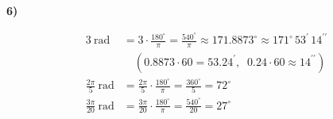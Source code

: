 \documentclass[11pt,a4paper,fleqn]{article}
\begin{document}
\textbf{6)}

\begin{align*}
  3\ \text{rad}
    &= 3 \cdot \frac{180^{\circ}}{\pi} = \frac{540^{\circ}}{\pi}
     \approx 171.8873^{\circ} \approx 171^{\circ}\,53^{\prime}\,14^{\prime\prime} \\
    &\quad \left( 0.8873 \cdot 60 = 53.24^{\prime}, \;\;
                  0.24 \cdot 60 \approx 14^{\prime\prime} \right) \\[8pt]
  \frac{2\pi}{5}\ \text{rad}
    &= \frac{2\pi}{5} \cdot \frac{180^{\circ}}{\pi} = \frac{360^{\circ}}{5} = 72^{\circ} \\[8pt]
  \frac{3\pi}{20}\ \text{rad}
    &= \frac{3\pi}{20} \cdot \frac{180^{\circ}}{\pi} = \frac{540^{\circ}}{20} = 27^{\circ}
\end{align*}
\end{document}
